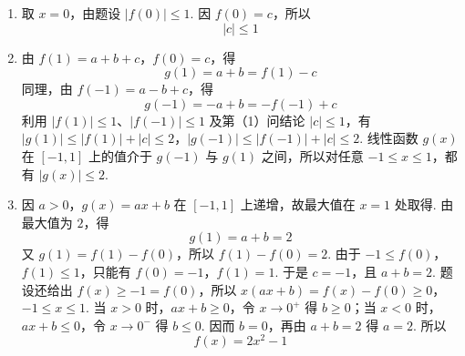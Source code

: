 \documentclass[UTF8,a4paper,oneside,11pt]{ctexbook}
\begin{document}
\begin{solution}
\begin{enumerate}
\item 取 \(x=0\)，由题设 \(\left|f(0)\right|\leqslant1\). 因 \(f(0)=c\)，所以
\[
\left|c\right|\leqslant1
\]

\item 由 \(f(1)=a+b+c\)，\(f(0)=c\)，得
\[
g(1)=a+b=f(1)-c
\]
同理，由 \(f(-1)=a-b+c\)，得
\[
g(-1)=-a+b=-f(-1)+c
\]
利用 \(\left|f(1)\right|\leqslant1\)、\(\left|f(-1)\right|\leqslant1\) 及第（1）问结论 \(\left|c\right|\leqslant1\)，有
\(\left|g(1)\right|\leqslant\left|f(1)\right|+\left|c\right|\leqslant2\)，\(\left|g(-1)\right|\leqslant\left|f(-1)\right|+\left|c\right|\leqslant2\).
线性函数 \(g(x)\) 在 \([-1,1]\) 上的值介于 \(g(-1)\) 与 \(g(1)\) 之间，所以对任意 \(-1\leqslant x\leqslant1\)，都有 \(\left|g(x)\right|\leqslant2\).

\item 因 \(a>0\)，\(g(x)=ax+b\) 在 \([-1,1]\) 上递增，故最大值在 \(x=1\) 处取得. 由最大值为 \(2\)，得
\[
g(1)=a+b=2
\]
又 \(g(1)=f(1)-f(0)\)，所以 \(f(1)-f(0)=2\). 由于 \(-1\leqslant f(0)\)，\(f(1)\leqslant1\)，只能有
\(f(0)=-1\)，\(f(1)=1\).
于是 \(c=-1\)，且 \(a+b=2\). 题设还给出 \(f(x)\geqslant-1=f(0)\)，所以
\(x(ax+b)=f(x)-f(0)\geqslant0\)，\(-1\leqslant x\leqslant1\).
当 \(x>0\) 时，\(ax+b\geqslant0\)，令 \(x\to0^+\) 得 \(b\geqslant0\)；当 \(x<0\) 时，\(ax+b\leqslant0\)，令 \(x\to0^-\) 得 \(b\leqslant0\). 因而 \(b=0\)，再由 \(a+b=2\) 得 \(a=2\). 所以
\[
f(x)=2x^2-1
\]
\end{enumerate}
\end{solution}

\end{document}
